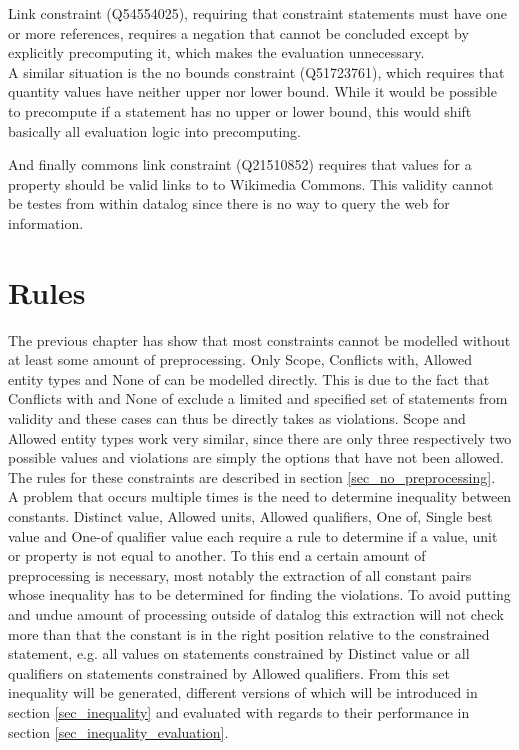 \documentclass[hyperref,bachelorofscience,fleqn]{cgvpub}
\begin{document}
Link constraint (Q54554025), requiring that constraint statements must have one or more references, requires a negation that cannot be concluded except by explicitly precomputing it, which makes the evaluation unnecessary. \\
A similar situation is the no bounds constraint (Q51723761), which requires that quantity values have neither upper nor lower bound. While it would be possible to precompute if a statement has no upper or lower bound, this would shift basically all evaluation logic into precomputing.

And finally commons link constraint (Q21510852) requires that values for a property should be valid links to to Wikimedia Commons. This validity cannot be testes from within datalog since there is no way to query the web for information.


\chapter{Rules}\label{cha_rules}
The previous chapter has show that most constraints cannot be modelled without at least some amount of preprocessing. Only Scope, Conflicts with, Allowed entity types and None of can be modelled directly. This is due to the fact that Conflicts with and None of exclude a limited and specified set of statements from validity and these cases can thus be directly takes as violations. Scope and Allowed entity types work very similar, since there are only three respectively two possible values and violations are simply the options that have not been allowed.  The rules for these constraints are described in section \ref{sec_no_preprocessing}.\\

A problem that occurs multiple times is the need to determine inequality between constants. Distinct value, Allowed units, Allowed qualifiers, One of, Single best value and One-of qualifier value each require a rule to determine if a value, unit or property is not equal to another. To this end a certain amount of preprocessing is necessary, most notably the extraction of all constant pairs whose inequality has to be determined for finding the violations. To avoid putting and undue amount of processing outside of datalog this extraction will not check more than that the constant is in the right position relative to the constrained statement, e.g. all values on statements constrained by Distinct value or all qualifiers on statements constrained by Allowed qualifiers. From this set inequality will be generated, different versions of which will be introduced in section \ref{sec_inequality} and evaluated with regards to their performance in section \ref{sec_inequality_evaluation}.\\
\end{document}
